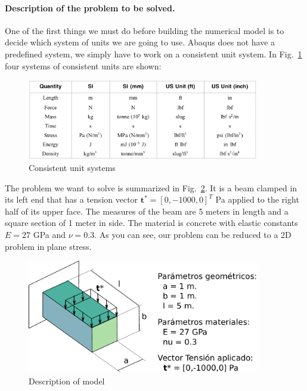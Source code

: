 \paragraph{Description of the problem to be solved.} One of the first
things we must do before building the numerical model is to decide
which system of units we are going to use. Abaqus does not have a
predefined system, we simply have to work on a consistent unit
system. In Fig.~\ref{figu01} four systems of consistent units are
shown:
\begin{figure}[!h]
  \begin{center}
    \includegraphics[width=0.9\textwidth]{./body/images/imagen01}
  \end{center}
  \caption{Consistent unit systems}
  \label{figu01}
\end{figure}

The problem we want to solve is summarized in Fig.~\ref{figu114}.  It
is a beam clamped in its left end that has a tension vector
$\mathbf{t}^*=[0,-1000,0]^T$ Pa applied to the right half of its upper
face. The measures of the beam are 5 meters in length and a square
section of 1 meter in side. The material is concrete with elastic
constants $E=27$ GPa and $\nu=0.3$. As you can see, our problem can be
reduced to a 2D problem in plane stress.

\begin{figure}[!h]
  \begin{center}
    \includegraphics[width=0.9\textwidth]{./body/images/imagen114}
  \end{center}
  \caption{Description of model}
  \label{figu114}
\end{figure}



